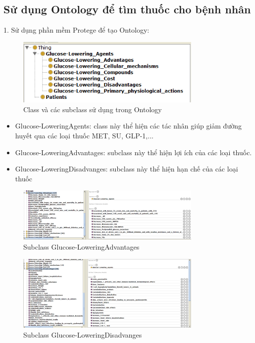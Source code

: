 \documentclass{article}
\begin{document}
\subsection{Sử dụng Ontology để tìm thuốc cho bệnh nhân}
    1. Sử dụng phần mềm Protege để tạo Ontology:
    \begin{figure}[H]
        \centering
        \includegraphics[width=0.8\textwidth]{o1.png}
        \caption{Class và các subclass sử dụng trong Ontology}
        \label{dongco}
    \end{figure}
 \begin{itemize}
    \item Glucose-LoweringAgents: class này thể hiện các tác nhân giúp giảm đường huyết qua các loại thuốc MET, SU, GLP-1,...
    \item Glucose-LoweringAdvantages: subclass này thể hiện lợi ích của các loại thuốc.
    \item Glucose-LoweringDisadvanges: subclass này thể hiện hạn chế của các loại thuốc
 \end{itemize}
 \begin{figure}[H]
    \centering
    \includegraphics[width=0.8\textwidth]{o2.png}
    \caption{Subclass Glucose-LoweringAdvantages}
    \label{dongco}
\end{figure}
\begin{figure}[H]
    \centering
    \includegraphics[width=0.8\textwidth]{o3.png}
    \caption{Subclass Glucose-LoweringDisadvanges}
    \label{dongco}
\end{figure}
\end{document}
